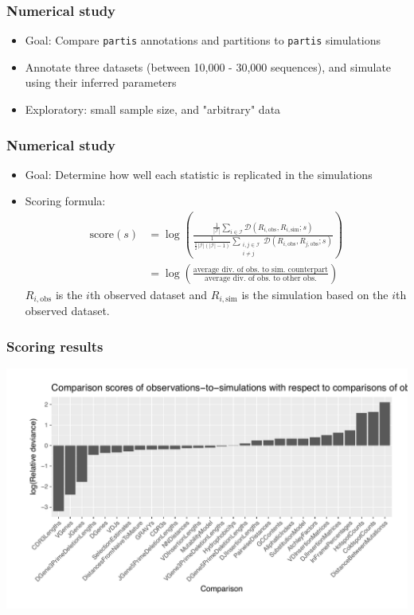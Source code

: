 \documentclass[mathserif,compress]{beamer}
\newcommand*\ba{\[ \begin{aligned}}
\newcommand*\ea{\end{aligned} \]}
\renewcommand\;{\,}
\begin{document}
\begin{frame}\frametitle{Numerical study}
\begin{itemize}
\item
Goal: Compare \texttt{partis} annotations and partitions to \texttt{partis} simulations
\bigskip
\item
Annotate three datasets (between 10,000 - 30,000 sequences), and simulate using their inferred parameters
\bigskip
\item
Exploratory: small sample size, and "arbitrary" data
\end{itemize}
\end{frame}


\begin{frame}\frametitle{Numerical study }
\begin{itemize}
\item
Goal: Determine how well each statistic is replicated in the simulations
\bigskip
\item
Scoring formula:
\ba
\text{score}(s) & =
\log \left( \frac{ \frac{1}{|\mathcal I|} \sum_{i \in \mathcal I} \mathcal D \left( R_{i, \text{obs}}, R_{i, \text{sim}} ; s\right) }
    { \frac{1}{\frac{1}{2} |\mathcal I|\left(|\mathcal I| - 1\right)}
        \sum_{\substack{i, j \in \mathcal I \\ i \ne j}} \mathcal D\left(R_{i, \text{obs}}, R_{j, \text{obs}}; s\right) } \right) \\
	& = \log \left( \frac{ \text{average div. of obs. to sim. counterpart} }
					{ \text{average div. of obs. to other obs.} } \right)
\ea 
$R_{i, \text{obs}}$ is the $i$th observed dataset and $R_{i, \text{sim}}$ is the simulation based on the $i$th observed dataset.  
\bigskip
\end{itemize}
\end{frame}

\begin{frame}\frametitle{Scoring results}
\begin{center}
\includegraphics[width=\linewidth]{Images/score_plot.pdf}
\end{center}
\end{frame}
\end{document}
